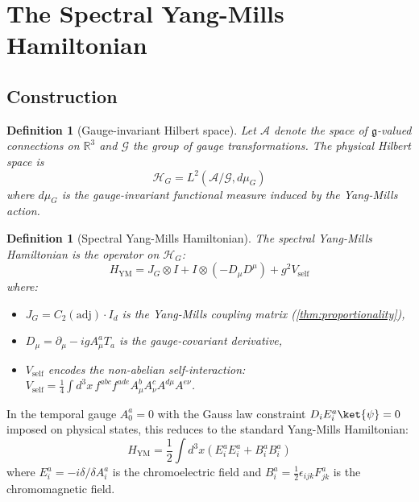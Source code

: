 \documentclass[11pt,a4paper]{article}
\theoremstyle{plain}
\newtheorem{definition}[theorem]{Definition}
\theoremstyle{remark}
\newcommand{\R}{\mathbb{R}}
\newcommand{\HH}{\mathcal{H}}
\newcommand{\AA}{\mathcal{A}}
\newcommand{\GG}{\mathcal{G}}
\newcommand{\adj}{\mathrm{adj}}
\begin{document}
\section{The Spectral Yang-Mills Hamiltonian}
\label{sec:hamiltonian}

\subsection{Construction}

\begin{definition}[Gauge-invariant Hilbert space]
Let $\AA$ denote the space of $\mathfrak{g}$-valued connections on $\R^3$
and $\GG$ the group of gauge transformations. The \emph{physical Hilbert
space} is
\[
  \HH_G = L^2(\AA/\GG, d\mu_G)
\]
where $d\mu_G$ is the gauge-invariant functional measure induced by the
Yang-Mills action.
\end{definition}

\begin{definition}[Spectral Yang-Mills Hamiltonian]
\label{def:HYM}
The \emph{spectral Yang-Mills Hamiltonian} is the operator on $\HH_G$:
\begin{equation}\label{eq:HYM}
  H_{\mathrm{YM}} = J_G \otimes I + I \otimes (-D_\mu D^\mu) + g^2 V_{\mathrm{self}}
\end{equation}
where:
\begin{itemize}[itemsep=2pt]
\item $J_G = C_2(\adj) \cdot I_d$ is the Yang-Mills coupling matrix
  (\cref{thm:proportionality}),
\item $D_\mu = \partial_\mu - ig A_\mu^a T_a$ is the gauge-covariant derivative,
\item $V_{\mathrm{self}}$ encodes the non-abelian self-interaction:
  $V_{\mathrm{self}} = \frac{1}{4}\int d^3x\, f^{abc} f^{ade}
  A_\mu^b A_\nu^c A^{d\mu} A^{e\nu}$.
\end{itemize}
\end{definition}

In the temporal gauge $A_0^a = 0$ with the Gauss law constraint
$D_i E_i^a \ket{\psi} = 0$ imposed on physical states, this reduces to the
standard Yang-Mills Hamiltonian:
\begin{equation}\label{eq:HYM-canonical}
  H_{\mathrm{YM}} = \frac{1}{2}\int d^3x\left(E_i^a E_i^a + B_i^a B_i^a\right)
\end{equation}
where $E_i^a = -i\delta/\delta A_i^a$ is the chromoelectric field and
$B_i^a = \frac{1}{2}\epsilon_{ijk} F_{jk}^a$ is the chromomagnetic field.
\end{document}
